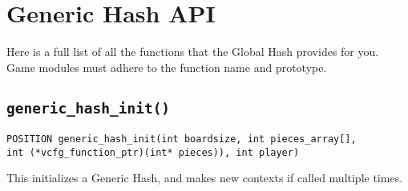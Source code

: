 \documentclass[11pt]{article}
\begin{document}
\section{Generic Hash API}

Here is a full list of all the functions that the Global Hash provides for you. Game modules must adhere to the function name and prototype.

\subsection{\texttt{generic\_hash\_init()}}

\texttt{POSITION generic\_hash\_init(int boardsize, int pieces\_array[],\\
int (*vcfg\_function\_ptr)(int* pieces)), int player)}

This initializes a Generic Hash, and makes new contexts if called multiple times.
\end{document}
